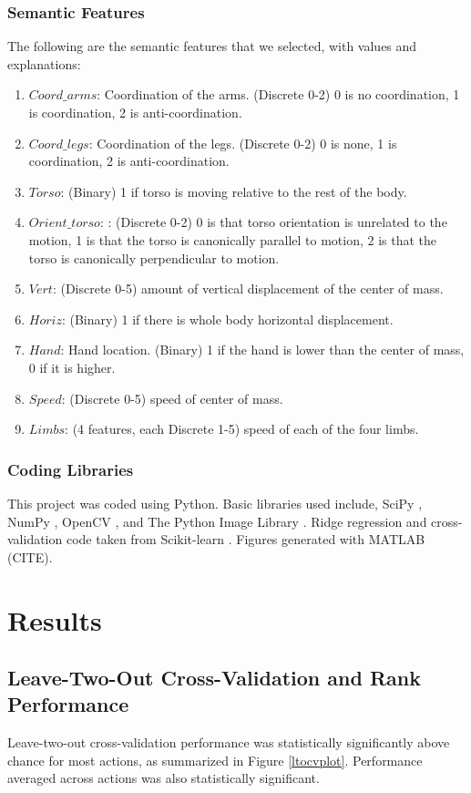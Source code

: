\documentclass{article}
\begin{document}
\subsubsection{Semantic Features}
\label{sf}
The following are the semantic features that we selected, with values and explanations:
\begin{enumerate}
\item
$Coord\_arms$: Coordination of the arms. (Discrete 0-2) 0 is no coordination, 1 is coordination, 2 is anti-coordination.
\item
$Coord\_legs$: Coordination of the legs. (Discrete 0-2) 0 is none, 1 is coordination, 2 is anti-coordination.
\item
$Torso$: (Binary) 1 if torso is moving relative to the rest of the body.
\item
$Orient\_torso$: : (Discrete 0-2) 0 is that torso orientation is unrelated to the motion, 1 is that the torso is canonically parallel to motion, 2 is that the torso is canonically perpendicular to motion.
\item
$Vert$: (Discrete 0-5) amount of vertical displacement of the center of mass.
\item
$Horiz$: (Binary) 1 if there is whole body horizontal displacement.
\item
$Hand$: Hand location. (Binary) 1 if the hand is lower than the center of mass, 0 if it is higher.
\item
$Speed$: (Discrete 0-5) speed of center of mass.
\item
$Limbs$: (4 features, each Discrete 1-5) speed of each of the four limbs.
\end{enumerate}
\subsubsection{Coding Libraries}
This project was coded using Python. Basic libraries used include, SciPy \cite{scipy}, NumPy \cite{numpy}, OpenCV \cite{opencv}, and The Python Image Library \cite{pil}. Ridge regression and cross-validation code taken from Scikit-learn \cite{scikit}. Figures generated with MATLAB (CITE).

\section{Results}

\subsection{Leave-Two-Out Cross-Validation and Rank Performance}
Leave-two-out cross-validation performance was statistically significantly above chance for most actions, as summarized in Figure \ref{ltocvplot}.  Performance averaged across actions was also statistically significant.
\end{document}
